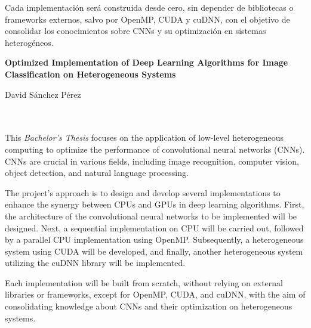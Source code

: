 Cada implementación será construida desde cero, sin depender de bibliotecas o frameworks externos, salvo por OpenMP, CUDA y cuDNN, con el objetivo de consolidar los conocimientos sobre CNNs y su optimización en sistemas heterogéneos.
\cleardoublepage


\thispagestyle{empty}


\begin{center}
{\large\bfseries Optimized Implementation of Deep Learning Algorithms for Image Classification on Heterogeneous Systems}\\
\end{center}
\begin{center}
David Sánchez Pérez\\
\end{center}

\\

\vspace{0.7cm}
\\

This \textit{Bachelor's Thesis} focuses on the application of low-level heterogeneous computing to optimize the performance of convolutional neural networks (CNNs). CNNs are crucial in various fields, including image recognition, computer vision, object detection, and natural language processing.

The project's approach is to design and develop several implementations to enhance the synergy between CPUs and GPUs in deep learning algorithms. First, the architecture of the convolutional neural networks to be implemented will be designed. Next, a sequential implementation on CPU will be carried out, followed by a parallel CPU implementation using OpenMP. Subsequently, a heterogeneous system using CUDA will be developed, and finally, another heterogeneous system utilizing the cuDNN library will be implemented.

Each implementation will be built from scratch, without relying on external libraries or frameworks, except for OpenMP, CUDA, and cuDNN, with the aim of consolidating knowledge about CNNs and their optimization on heterogeneous systems.


